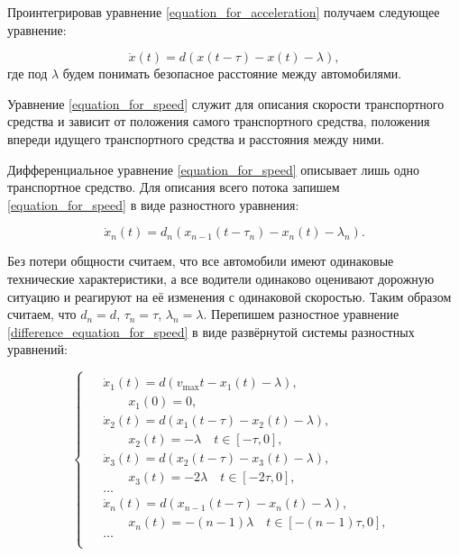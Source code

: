 \documentclass[12pt, a4paper]{extarticle}
\numberwithin{equation}{section}
\begin{document}
Проинтегрировав уравнение \eqref{equation_for_acceleration} получаем следующее уравнение: 

\begin{equation} \label{equation_for_speed}
\dot{x}(t) = d(x(t-\tau) - x(t) - \lambda),
\end{equation}
где под $\lambda$ будем понимать безопасное расстояние между автомобилями.

Уравнение \eqref{equation_for_speed} служит для описания скорости транспортного средства и зависит от положения самого транспортного средства, положения впереди идущего транспортного средства и расстояния между ними. 

Дифференциальное уравнение \eqref{equation_for_speed} описывает лишь одно транспортное средство. Для описания всего потока запишем \eqref{equation_for_speed} в виде разностного уравнения:

\begin{equation} \label{difference_equation_for_speed}
\dot{x}_n(t) = d_n(x_{n-1}(t-\tau_n) - x_n(t) - \lambda_n).
\end{equation}

Без потери общности считаем, что все автомобили имеют одинаковые технические характеристики, а все водители одинаково оценивают дорожную ситуацию и реагируют на её изменения с одинаковой скоростью. Таким образом считаем, что $d_n = d$, $\tau_n = \tau$, $\lambda_n = \lambda$. Перепишем разностное уравнение \eqref{difference_equation_for_speed} в виде развёрнутой системы разностных уравнений:

\begin{equation} \label{equation_without_stopping}
\begin{cases}
\begin{split}
&\dot{x}_1(t) = d (v_{\max} t - x_1(t) - \lambda), \\ 
&\qquad x_1(0) = 0, \\
&\dot{x}_2(t) = d (x_1(t-\tau)-x_2(t) - \lambda), \\
&\qquad x_2(t) = -\lambda \quad t \in [-\tau, 0], \\
&\dot{x}_3(t) = d (x_2(t-\tau)-x_3(t) - \lambda), \\
&\qquad x_3(t) = -2\lambda \quad t \in [-2\tau, 0], \\
&\ldots \\
&\dot{x}_n(t) = d ({x}_{n-1}(t-\tau)-x_n(t) - \lambda), \\
&\qquad x_n(t) = -(n-1)\lambda \quad t \in [-(n-1)\tau, 0], \\
&\ldots \\
\end{split}
\end{cases}
\end{equation}
\end{document}
